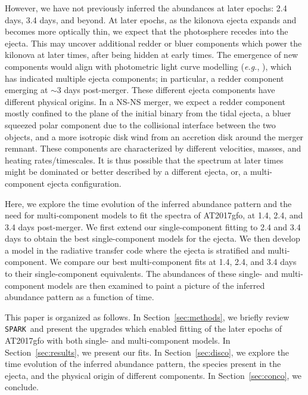 \documentclass[twocolumn,twocolappendix]{aastex63}
\def\SPARK{\texttt{SPARK}}
\def\eg{{\it e.g.}}
\begin{document}
However, we have not previously inferred the abundances at later epochs: 2.4 days, 3.4 days, and beyond. At later epochs, as the kilonova ejecta expands and becomes more optically thin, we expect that the photosphere recedes into the ejecta. This may uncover additional redder or bluer components which power the kilonova at later times, after being hidden at early times. The emergence of new components would align with photometric light curve modelling (\eg, \citealt{villar17}), which has indicated multiple ejecta components; in particular, a redder component emerging at $\sim 3$ days post-merger. These different ejecta components have different physical origins. In a NS-NS merger, we expect a redder component mostly confined to the plane of the initial binary from the tidal ejecta, a bluer squeezed polar component due to the collisional interface between the two objects, and a more isotropic disk wind from an accretion disk around the merger remnant. These components are characterized by different velocities, masses, and heating rates/timescales. It is thus possible that the spectrum at later times might be dominated or better described by a different ejecta, or, a multi-component ejecta configuration. 

Here, we explore the time evolution of the inferred abundance pattern and the need for multi-component models to fit the spectra of AT2017gfo, at 1.4, 2.4, and 3.4 days post-merger. We first extend our single-component fitting to 2.4 and 3.4 days to obtain the best single-component models for the ejecta. We then develop a model in the radiative transfer code where the ejecta is stratified and multi-component. We compare our best multi-component fits at 1.4, 2.4, and 3.4 days to their single-component equivalents. The abundances of these single- and multi-component models are then examined to paint a picture of the inferred abundance pattern as a function of time. 

This paper is organized as follows. In Section~\ref{sec:methods}, we briefly review \SPARK~and present the upgrades which enabled fitting of the later epochs of AT2017gfo with both single- and multi-component models. In Section~\ref{sec:results}, we present our fits. In Section~\ref{sec:disco}, we explore the time evolution of the inferred abundance pattern, the species present in the ejecta, and the physical origin of different components. In Section~\ref{sec:conco}, we conclude.





\end{document}
